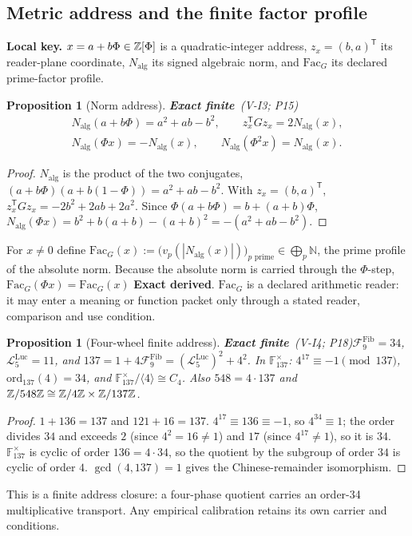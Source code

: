 \documentclass[11pt,a4paper]{article}
\newcommand{\NN}{\mathbb{N}}\newcommand{\CC}{\mathbb{C}}
\newcommand{\tp}{^{\mathsf T}}
\newcommand{\Nalg}{N_{\mathrm{alg}}}\newcommand{\Fac}{\mathrm{Fac}_G}
\newcommand{\Fib}[1]{\mathcal{F}^{\mathrm{Fib}}_{#1}}\newcommand{\Luc}[1]{\mathcal{L}^{\mathrm{Luc}}_{#1}}
\newcommand{\st}[1]{\textsf{\small\textbf{#1}}}
\newcommand{\Sfin}{\st{Exact finite}}\newcommand{\Sder}{\st{Exact derived}}
\newcommand{\lkey}[1]{\par\noindent\textbf{Local key.} #1\par\smallskip}
\theoremstyle{plain}
\newtheorem{prop}[thm]{Proposition}
\theoremstyle{definition}
\theoremstyle{remark}
\begin{document}
\subsection{Metric address and the finite factor profile}
\lkey{$x=a+b\Phi\in\mathbb{Z}[\Phi]$ is a quadratic-integer address, $z_x=(b,a)\tp$ its reader-plane coordinate, $\Nalg$ its signed algebraic norm, and $\Fac$ its declared prime-factor profile.}
\begin{prop}[Norm address]\Sfin\ \textit{(V-I3; P15)}\label{prop:norm}
\[
\begin{gathered}
\Nalg(a+b\Phi)=a^2+ab-b^2,\qquad z_x\tp Gz_x=2\Nalg(x),\\
\Nalg(\Phi x)=-\Nalg(x),\qquad \Nalg(\Phi^2x)=\Nalg(x).
\end{gathered}
\]
\end{prop}
\begin{proof}
$\Nalg$ is the product of the two conjugates, $(a+b\Phi)(a+b(1-\Phi))=a^2+ab-b^2$. With $z_x=(b,a)\tp$, $z_x\tp Gz_x=-2b^2+2ab+2a^2$. Since $\Phi(a+b\Phi)=b+(a+b)\Phi$, $\Nalg(\Phi x)=b^2+b(a+b)-(a+b)^2=-(a^2+ab-b^2)$.
\end{proof}
For $x\ne0$ define $\Fac(x):=\bigl(v_p(|\Nalg(x)|)\bigr)_{p\text{ prime}}\in\bigoplus_p\NN$, the prime profile of the absolute norm. Because the absolute norm is carried through the $\Phi$-step, $\Fac(\Phi x)=\Fac(x)$ \Sder. $\Fac$ is a declared arithmetic reader: it may enter a meaning or function packet only through a stated reader, comparison and use condition.

\begin{prop}[Four-wheel finite address]\Sfin\ \textit{(V-I4; P18)}\label{prop:137}
$\Fib9=34$, $\Luc5=11$, and $137=1+4\Fib9=(\Luc5)^2+4^2$. In $\mathbb F_{137}^{\times}$: $4^{17}\equiv-1\pmod{137}$, $\mathrm{ord}_{137}(4)=34$, and $\mathbb F_{137}^{\times}/\langle4\rangle\cong C_4$. Also $548=4\cdot137$ and $\mathbb{Z}/548\mathbb{Z}\cong\mathbb{Z}/4\mathbb{Z}\times\mathbb{Z}/137\mathbb{Z}$.
\end{prop}
\begin{proof}
$1+136=137$ and $121+16=137$. $4^{17}\equiv136\equiv-1$, so $4^{34}\equiv1$; the order divides $34$ and exceeds $2$ (since $4^2=16\ne1$) and $17$ (since $4^{17}\ne1$), so it is $34$. $\mathbb F_{137}^{\times}$ is cyclic of order $136=4\cdot34$, so the quotient by the subgroup of order $34$ is cyclic of order $4$. $\gcd(4,137)=1$ gives the Chinese-remainder isomorphism.
\end{proof}
This is a finite address closure: a four-phase quotient carries an order-34 multiplicative transport. Any empirical calibration retains its own carrier and conditions.
\end{document}

